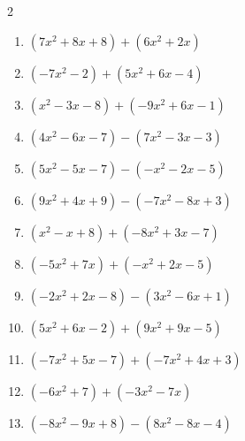 \begin{multicols}{2}
\begin{enumerate}

  \item $(7x^{2}+8x+8)+(6x^{2}+2x)$


  \item $(-7x^{2}-2)+(5x^{2}+6x-4)$


  \item $(x^{2}-3x-8)+(-9x^{2}+6x-1)$


  \item $(4x^{2}-6x-7)-(7x^{2}-3x-3)$


  \item $(5x^{2}-5x-7)-(-x^{2}-2x-5)$


  \item $(9x^{2}+4x+9)-(-7x^{2}-8x+3)$


  \item $(x^{2}-x+8)+(-8x^{2}+3x-7)$


  \item $(-5x^{2}+7x)+(-x^{2}+2x-5)$


  \item $(-2x^{2}+2x-8)-(3x^{2}-6x+1)$


  \item $(5x^{2}+6x-2)+(9x^{2}+9x-5)$


\columnbreak %

  \item $(-7x^{2}+5x-7)+(-7x^{2}+4x+3)$


  \item $(-6x^{2}+7)+(-3x^{2}-7x)$


  \item $(-8x^{2}-9x+8)-(8x^{2}-8x-4)$



\end{enumerate}
\end{multicols}
